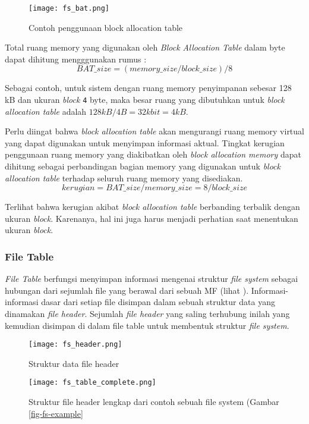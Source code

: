 \documentclass[a4paper, 12pt]{report}
\begin{document}
\begin{figure}[t]
\centering
\texttt{[image: fs\_bat.png]}
\caption{Contoh penggunaan block allocation table}
\label{fig-bat}
\end{figure}

Total ruang memory yang digunakan oleh {\em Block Allocation Table} dalam byte dapat dihitung mengggunakan rumus :
$$
BAT\_size=(memory\_size/block\_size)/8
$$

Sebagai contoh, untuk sistem dengan ruang memory penyimpanan sebesar 128 kB dan ukuran {\em block} {\tt 4} byte, maka besar ruang yang dibutuhkan untuk {\em block allocation table} adalah $128kB/4B=32kbit=4kB$.

Perlu diingat bahwa {\em block allocation table} akan mengurangi ruang memory virtual yang dapat digunakan untuk menyimpan informasi aktual. Tingkat kerugian penggunaan ruang memory yang diakibatkan oleh {\em block allocation memory} dapat dihitung sebagai perbandingan bagian memory yang digunakan untuk {\em block allocation table} terhadap seluruh ruang memory yang disediakan.
$$
kerugian=BAT\_size/memory\_size=8/block\_size
$$

Terlihat bahwa kerugian akibat {\em block allocation table} berbanding terbalik dengan ukuran {\em block}. Karenanya, hal ini juga harus menjadi perhatian saat menentukan ukuran {\em block}.

\subsubsection{File Table}
\label{file-table}

{\em File Table} berfungsi menyimpan informasi mengenai struktur {\em file system} sebagai hubungan dari sejumlah file yang berawal dari sebuah MF (lihat ). Informasi-informasi dasar dari setiap file disimpan dalam sebuah struktur data yang dinamakan {\em file header}. Sejumlah {\em file header} yang saling terhubung inilah yang kemudian disimpan di dalam file table untuk membentuk struktur {\em file system}.

\begin{figure}[h]
\centering
\texttt{[image: fs\_header.png]}
\caption{Struktur data file header}
\label{fig-header-field}
\end{figure}

\begin{figure}
\centering
\texttt{[image: fs\_table\_complete.png]}
\caption{Struktur file header lengkap dari contoh sebuah file system (Gambar \ref{fig-fs-example}}
\label{fig-header-complete}
\end{figure}
\end{document}
